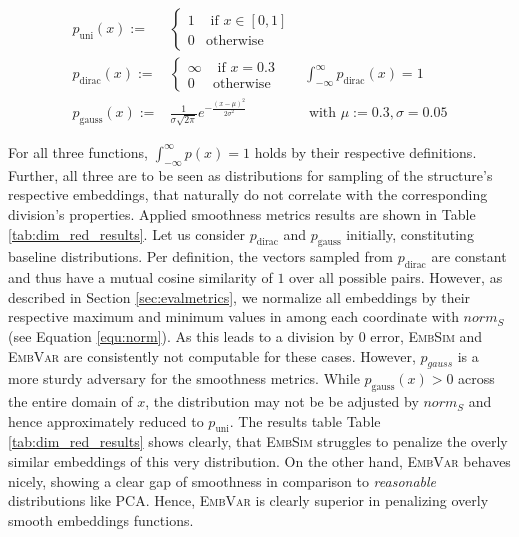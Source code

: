 \documentclass[]{article}
\begin{document}
\begin{align}
	p_\text{uni}(x):=&\begin{cases}
		1 & \text{ if }x\in [0,1]\\
		0& \text{otherwise}
	\end{cases}&\\
	p_\text{dirac}(x):= &\begin{cases}
		\infty & \text{ if }x=0.3\\
		0& \text{otherwise}
	\end{cases} &\int_{-\infty}^{\infty}p_\text{dirac}(x)=1\\
	p_\text{gauss}(x):=&\frac{1}{{\sigma \sqrt {2\pi } }}e^{-\frac{(x-\mu)^2}{2\sigma^2}} &\text{ with }\mu:=0.3, \sigma=0.05
\end{align}

For all three functions, $\int_{-\infty}^{\infty}p(x)=1$ holds by their respective definitions. \\

Further, all three are to be seen as distributions for sampling of the structure's respective embeddings, that naturally do not correlate with the corresponding division's properties. Applied smoothness metrics results are shown in Table \ref{tab:dim_red_results}. Let us consider $p_\text{dirac}$ and $p_\text{gauss}$ initially, constituting baseline distributions. Per definition, the vectors sampled from $p_\text{dirac}$ are constant and thus have a mutual cosine similarity of $1$ over all possible pairs. However, as described in Section \ref{sec:evalmetrics}, we normalize all embeddings by their respective maximum and minimum values in among each coordinate with $norm_S$ (see Equation \ref{equ:norm}). As this leads to a division by 0 error, \textsc{EmbSim} and \textsc{EmbVar} are consistently not computable for these cases. 
However, $p_{gauss}$ is a more sturdy adversary for the smoothness metrics. While $p_\text{gauss}(x)>0$ across the entire domain of $x$, the distribution may not be be adjusted by $norm_S$ and hence approximately reduced to $p_\text{uni}$. The results table Table \ref{tab:dim_red_results} shows clearly, that \textsc{EmbSim} struggles to penalize the overly similar embeddings of this very distribution. On the other hand, \textsc{EmbVar} behaves nicely, showing a clear gap of smoothness in comparison to \textit{reasonable} distributions like PCA. Hence, \textsc{EmbVar} is clearly superior in penalizing overly smooth embeddings functions.\\
\end{document}
